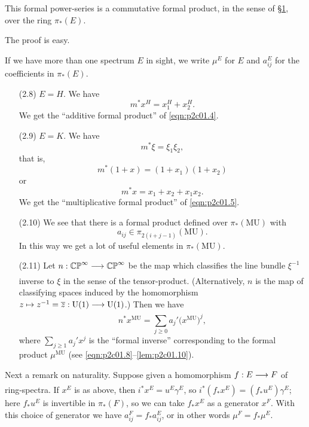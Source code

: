 \documentclass[../main]{subfiles}
\begin{document}
\begin{customlemma}{2.7}
This formal power-series is a commutative formal product, in the sense of \hyperref[sec:p2c1]{\S 1}, over the ring $\pi_\ast(E)$. 
\end{customlemma}

The proof is easy.

If we have more than one spectrum $E$ in sight, we write $\mu^E$ for $E$ and $a_{ij}^E$ for the coefficients in $\pi_\ast(E)$. 

\begin{examples}
\begin{enumerate}
    \item[(2.8)]\label{ex:p2c02.8}$E = H$. We have \[m^\ast x^H = x_1^H + x_2^H.\] We get the ``additive formal product'' of \eqref{eqn:p2c01.4}.
    \item[(2.9)]\label{ex:p2c02.9}$E = K$. We have \[m^\ast \xi = \xi_1 \xi_2,\] that is, \[m^\ast(1 + x) = (1 + x_1) (1 + x_2)\] or \[m^\ast x = x_1 + x_2 + x_1 x_2.\] We get the ``multiplicative formal product'' of \eqref{eqn:p2c01.5}.
    \item[(2.10)] We see that there is a formal product defined over $\pi_\ast(\mathrm{MU})$ with \[a_{ij} \in \pi_{2(i + j - 1)} (\mathrm{MU}).\] In this way we get a lot of useful elements in $\pi_\ast(\mathrm{MU})$.
    \item[(2.11)] Let $n : \mathbb {CP}^\infty \lar{} \mathbb {CP}^\infty$ be the map which classifies the line bundle $\xi^{-1}$ inverse to $\xi$ in the sense of the tensor-product. (Alternatively, $n$ is the map of classifying spaces induced by the homomorphism $z \mapsto z^{-1} = \overline z : \mathrm{U}(1) \lar{} \mathrm{U}(1)$.) Then we have \[n^\ast x^{\mathrm{MU}} = \sum_{j \ge 0} a_j' \big(x^{\mathrm{MU}}\big)^j,\] where $\displaystyle \sum_{j \ge 1} a_j' x^j$ is the ``formal inverse'' corresponding to the formal product $\mu^{\mathrm{MU}}$ (see \eqref{eqn:p2c01.8}--\eqref{lem:p2c01.10}).
\end{enumerate}
\end{examples}

Next a remark on naturality. Suppose given a homomorphism $f : E \lar{} F$ of ring-spectra. If $x^E$ is as above, then $i^\ast x^E = u^E \gamma^E$, so $i^\ast(f_\ast x^E) = (f_\ast u^E) \gamma^E$; here $f_\ast u^E$ is invertible in $\pi_\ast(F)$, so we can take $f_\ast x^E$ as a generator $x^F$. With this choice of generator we have $a_{ij}^F = f_\ast a_{ij}^E$, or in other words $\mu^F = f_\ast \mu^E$. 
\end{document}
